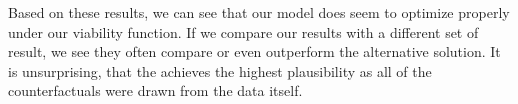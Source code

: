 \documentclass[./../../paper.tex]{subfiles}
\begin{document}
Based on these results, we can see that our model does seem to optimize properly under our viability function. If we compare our results with a different set of result, we see they often compare or even outperform the alternative solution. 
It is unsurprising, that the \ModelCBG achieves the highest plausibility as all of the counterfactuals were drawn from the data itself. 

\end{document}
